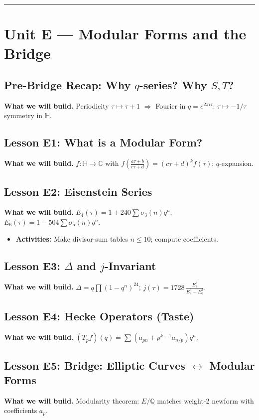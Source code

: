 \documentclass[11pt]{article}
\begin{document}
\bigskip
\hrule
\bigskip

\section*{Unit E --- Modular Forms and the Bridge}
\subsection*{Pre-Bridge Recap: Why $q$-series? Why $S,T$?}
\textbf{What we will build.} Periodicity $\tau\mapsto\tau+1$ $\Rightarrow$ Fourier in $q=e^{2\pi i\tau}$; $\tau\mapsto-1/\tau$ symmetry in $\mathbb{H}$.

\subsection*{Lesson E1: What is a Modular Form?}
\textbf{What we will build.} $f:\mathbb{H}\to\mathbb{C}$ with $f\!\left(\frac{a\tau+b}{c\tau+d}\right)=(c\tau+d)^k f(\tau)$; $q$-expansion.

\subsection*{Lesson E2: Eisenstein Series}
\textbf{What we will build.} $E_4(\tau)=1+240\sum\sigma_3(n)q^n$, $E_6(\tau)=1-504\sum\sigma_5(n)q^n$.
\begin{itemize}
\item \textbf{Activities:} Make divisor-sum tables $n\le 10$; compute coefficients.
\end{itemize}

\subsection*{Lesson E3: $\Delta$ and $j$-Invariant}
\textbf{What we will build.} $\Delta=q\prod(1-q^n)^{24}$; $j(\tau)=1728\,\frac{E_4^3}{E_4^3-E_6^2}$.

\subsection*{Lesson E4: Hecke Operators (Taste)}
\textbf{What we will build.} $(T_p f)(q)=\sum(a_{pn}+p^{k-1}a_{n/p})q^n$.

\subsection*{Lesson E5: Bridge: Elliptic Curves $\leftrightarrow$ Modular Forms}
\textbf{What we will build.} Modularity theorem: $E/\mathbb{Q}$ matches weight-2 newform with coefficients $a_p$.
\end{document}
